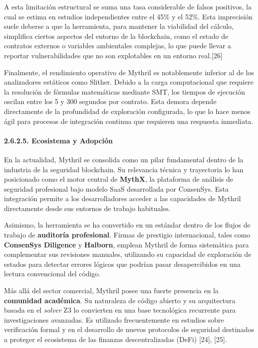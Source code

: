 A esta limitación estructural se suma una tasa considerable de falsos
positivos, la cual se estima en estudios independientes entre el 45\% y
el 52\%. Esta imprecisión suele deberse a que la herramienta, para
mantener la viabilidad del cálculo, simplifica ciertos aspectos del
entorno de la blockchain, como el estado de contratos externos o
variables ambientales complejas, lo que puede llevar a reportar
vulnerabilidades que no son explotables en un entorno real.{[}26{]}

Finalmente, el rendimiento operativo de Mythril es notablemente inferior
al de los analizadores estáticos como Slither. Debido a la carga
computacional que requiere la resolución de fórmulas matemáticas
mediante SMT, los tiempos de ejecución oscilan entre los 5 y 300
segundos por contrato. Esta demora depende directamente de la
profundidad de exploración configurada, lo que lo hace menos ágil para
procesos de integración continua que requieren una respuesta inmediata.

\paragraph{2.6.2.5. Ecosistema y
Adopción}\label{ecosistema-y-adopciuxf3n}

En la actualidad, Mythril se consolida como un pilar fundamental dentro
de la industria de la seguridad blockchain. Su relevancia técnica y
trayectoria lo han posicionado como el motor central de \textbf{MythX},
la plataforma de análisis de seguridad profesional bajo modelo SaaS
desarrollada por ConsenSys. Esta integración permite a los
desarrolladores acceder a las capacidades de Mythril directamente desde
sus entornos de trabajo habituales.

Asimismo, la herramienta se ha convertido en un estándar dentro de los
flujos de trabajo de \textbf{auditoría profesional}. Firmas de prestigio
internacional, tales como \textbf{ConsenSys Diligence} y
\textbf{Halborn}, emplean Mythril de forma sistemática para complementar
sus revisiones manuales, utilizando su capacidad de exploración de
estados para detectar errores lógicos que podrían pasar desapercibidos
en una lectura convencional del código.

Más allá del sector comercial, Mythril posee una fuerte presencia en la
\textbf{comunidad académica}. Su naturaleza de código abierto y su
arquitectura basada en el \emph{solver} Z3 lo convierten en una base
tecnológica recurrente para investigaciones avanzadas. Es utilizado
frecuentemente en estudios sobre verificación formal y en el desarrollo
de nuevos protocolos de seguridad destinados a proteger el ecosistema de
las finanzas descentralizadas (DeFi) {[}24{]}, {[}25{]}.

